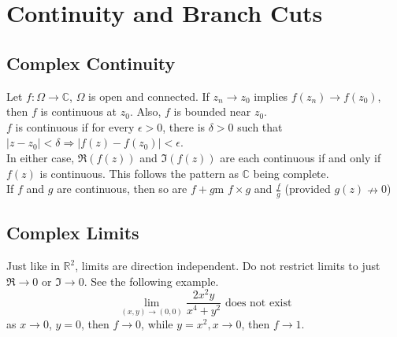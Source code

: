 \documentclass[11pt]{article}
\begin{document}
\section{Continuity and Branch Cuts}
\subsection{Complex Continuity} 
Let $f:\Omega \to \mathbb{C}$, $\Omega$ is open and connected. If $z_n \to z_0$ implies $f(z_n) \to f(z_0)$, then $f$ is continuous at $z_0$. Also, $f$ is bounded near $z_0$. \\
$f$ is continuous if for every $\epsilon > 0$, there is $\delta > 0$ such that $|z - z_0| < \delta \Rightarrow |f(z) - f(z_0)| < \epsilon$. \\
\newline 
In either case, $\Re(f(z))$ and $\Im(f(z))$ are each continuous if and only if $f(z)$ is continuous. This follows the pattern as $\mathbb{C}$ being complete. \\
\newline
If $f$ and $g$ are continuous, then so are $f + g$m $f \times g$ and $\frac{f}{g}$ (provided $g(z) \nrightarrow 0$)

\subsection{Complex Limits}
Just like in $\mathbb{R}^2$, limits are direction independent. Do not restrict limits to just $\Re \to 0$ or $\Im \to 0$. See the following example. \\
\begin{equation*}
\lim_{(x, y) \to (0, 0)} \frac{2x^2y}{x^4 + y^2} \mbox{ does not exist}
\end{equation*} 
as $x \to 0$, $y = 0$, then $f \to 0$, while $y = x^2, x \to 0$, then $f \to 1$.
\end{document}
